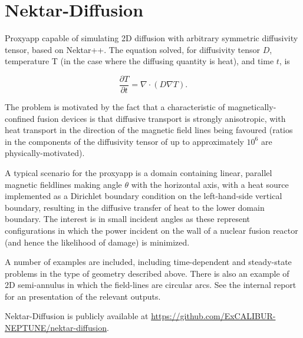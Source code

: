 \section{Nektar-Diffusion}
Proxyapp capable of simulating 2D diffusion with arbitrary symmetric diffusivity tensor, based on Nektar++.  The
equation solved, for diffusivity tensor $D$, temperature T (in the case where the diffusing quantity is heat), and 
time $t$, is

\begin{equation}
\frac{\partial T}{\partial t} = \nabla \cdot \left ( D  \nabla T \right ). 
\end{equation}  

The problem is motivated by the fact that a characteristic of magnetically-confined fusion devices is that diffusive 
transport is strongly anisotropic, with heat transport in the direction of the magnetic field lines being favoured 
(ratios in the components of the diffusivity tensor of up to approximately $10^6$ are physically-motivated).

A typical scenario for the proxyapp is a domain containing linear, parallel magnetic fieldlines making 
angle $\theta$ with the horizontal axis, with a heat source implemented as a Dirichlet boundary condition on the 
left-hand-side vertical boundary, resulting in the diffusive transfer of heat to the lower domain boundary.  The 
interest is in small incident angles as these represent configurations in which the power incident on the wall of a 
nuclear fusion reactor (and hence the likelihood of damage) is minimized.

A number of examples are included, including time-dependent and steady-state problems in the type of geometry
 described above.  There is also an example of 2D semi-annulus in which the field-lines are circular arcs.  See the 
internal report \cite{y3re222} for an presentation of the relevant outputs.

Nektar-Diffusion is publicly available at \url{https://github.com/ExCALIBUR-NEPTUNE/nektar-diffusion}.
